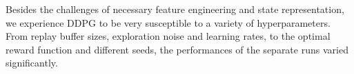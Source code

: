 \par
Besides the challenges of necessary feature engineering and state representation, we experience DDPG to be very susceptible to a variety of hyperparameters. From replay buffer sizes, exploration noise and learning rates, to the optimal reward function and different seeds, the performances of the separate runs varied significantly.
